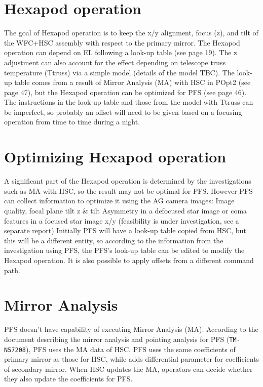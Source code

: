 \section{Hexapod operation}\label{sec:Hexapod}

The goal of Hexapod operation is to keep the x/y alignment, focus (z), and tilt of the WFC+HSC assembly with respect to the primary mirror.
The Hexapod operation can depend on EL following a look-up table (see page 19). The z adjustment can also account for the effect depending on telescope truss temperature (Ttruss) via a simple model (details of the model TBC).
The look-up table comes from a result of Mirror Analysis (MA) with HSC in POpt2 (see page 47), but the Hexapod operation can be optimized for PFS (see page 46).
The instructions in the look-up table and those from the model with Ttruss can be imperfect, so probably an offset will need to be given based on a focusing operation from time to time during a night.

\section{Optimizing Hexapod operation}

A significant part of the Hexapod operation is determined by the investigations such as MA with HSC, so the result may not be optimal for PFS.
However PFS can collect information to optimize it using the AG camera images:
Image quality, focal plane tilt z \& tilt
Asymmetry in a defocused star image or coma features in a focused star image  x/y (feasibility is under investigation, see a separate report)
Initially PFS will have a look-up table copied from HSC, but this will be a different entity, so according to the information from the investigation using PFS, the PFS's look-up table can be edited to modify the Hexapod operation. It is also possible to apply offsets from a different command path.


\section{Mirror Analysis}\label{sec:MA}
PFS doesn't have capability of executing Mirror Analysis (MA).
According to the document describing the mirror analysis and pointing analysis for PFS ({\tt TM-N57208}), PFS uses the MA data of HSC.
PFS uses the same coefficients of primary mirror as those for HSC, while adds differential parameter for coefficients of secondary mirror. 
When HSC updates the MA, operators can decide whether they also update the coefficients for PFS.

